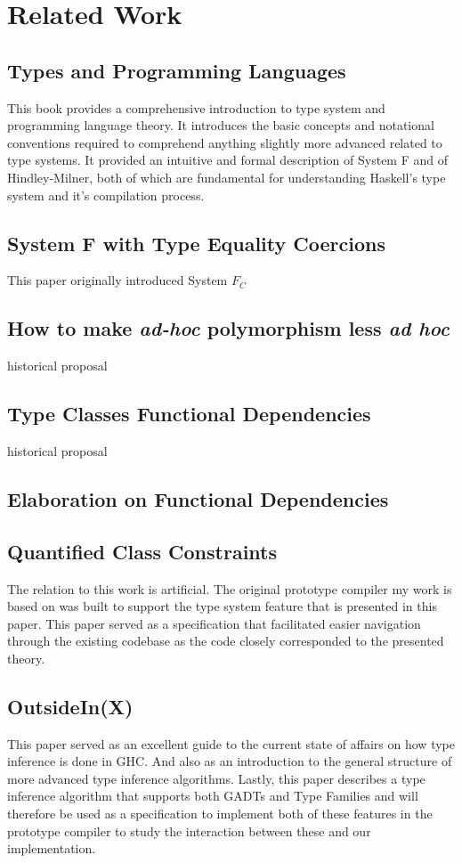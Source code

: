 \section{Related Work}
\subsection{Types and Programming Languages\cite{pierce2002types}}
This book provides a comprehensive introduction to type system and programming
language theory. It introduces the basic concepts and notational conventions
required to comprehend anything slightly more advanced related to type systems.
It provided an intuitive and formal description of System F and of
Hindley-Milner, both of which are fundamental for understanding Haskell's type
system and it's compilation process.
\subsection{System F with Type Equality
Coercions\cite{Sulzmann:2007:SFT:1190315.1190324}}
This paper originally introduced System $F_C$
\subsection{How to make \textit{ad-hoc} polymorphism less \textit{ad
hoc}\cite{Wadler:1989:MAP:75277.75283}}
historical proposal
\subsection{Type Classes Functional Dependencies\cite{Jones00typeclasses}}
historical proposal
\subsection{Elaboration on Functional
Dependencies\cite{Karachalias:2017:EFD:3156695.3122966}}

\subsection{Quantified Class Constraints\cite{Bottu:2017:QCC:3156695.3122967}}
The relation to this work is artificial. The original prototype compiler my work
is based on was built to support the type system feature that is presented in
this paper. This paper served as a specification that facilitated easier
navigation through the existing codebase as the code closely corresponded to the
presented theory.
\subsection{OutsideIn(X)\cite{outsideinx-modular-type-inference-with-local-assumptions}}
This paper served as an excellent guide to the current state of affairs on how
type inference is done in GHC. And also as an introduction to the general
structure of more advanced type inference algorithms. Lastly, this paper
describes a type inference algorithm that supports both GADTs and Type Families
and will therefore be used as a specification to implement both of these
features in the prototype compiler to study the interaction between these and
our implementation.
